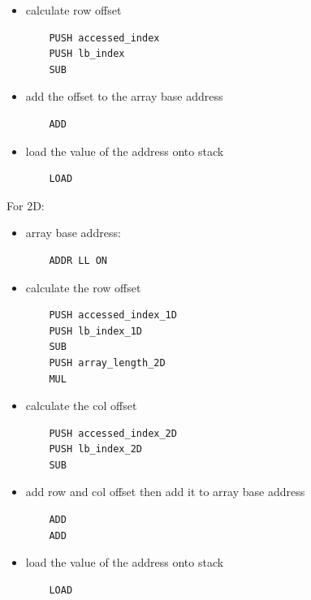 \documentclass[11pt]{article}
\begin{document}
\begin{enumerate}[label=(\alph*)]
\begin{itemize}
\item calculate row offset
    \begin{lstlisting}
    PUSH accessed_index
    PUSH lb_index
    SUB
    \end{lstlisting}
\item add the offset to the array base address
    \begin{lstlisting}
    ADD
    \end{lstlisting}
\item load the value of the address onto stack
    \begin{lstlisting}
    LOAD
    \end{lstlisting}
\end{itemize}
For 2D:
\begin{itemize}
\item array base address:
	\begin{lstlisting}
    ADDR LL ON
    \end{lstlisting}
\item calculate the row offset
	\begin{lstlisting}
    PUSH accessed_index_1D
    PUSH lb_index_1D
    SUB
    PUSH array_length_2D
    MUL
    \end{lstlisting}
\item calculate the col offset
	\begin{lstlisting}
    PUSH accessed_index_2D
    PUSH lb_index_2D
    SUB
    \end{lstlisting}
\item add row and col offset then add it to array base address
	\begin{lstlisting}
    ADD
    ADD
    \end{lstlisting}
\item load the value of the address onto stack
	\begin{lstlisting}
    LOAD
    \end{lstlisting}
\end{itemize}


\end{enumerate}
\end{document}
